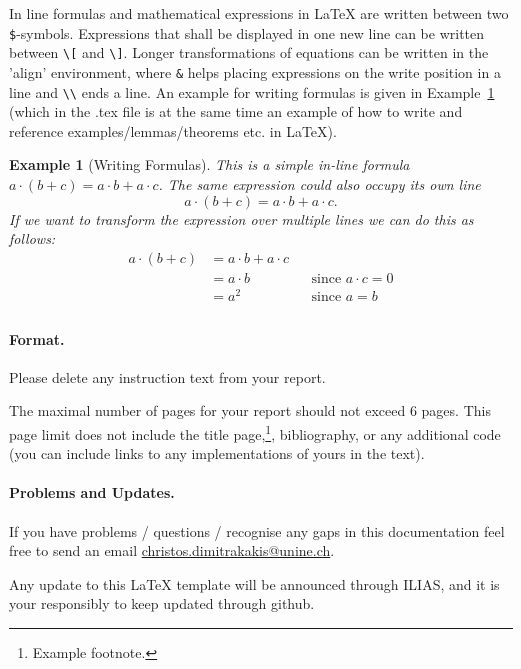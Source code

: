 \documentclass[a4paper,11pt]{article}
\newtheorem{example}{Example}
\theoremstyle{definition}
\begin{document}
In line formulas and mathematical expressions in \LaTeX{} are written between two \verb|$|-symbols. Expressions that shall be displayed in one new line can be written between 
\verb|\[| and \verb|\]|. Longer transformations of equations can be written in the 'align' environment, where \verb|&| helps placing expressions on the write position in a line and \verb|\\| ends a line. An  example for writing formulas is given in Example~\ref{ex:formulas} (which in the .tex file is at the same time an example of how to write and reference examples/lemmas/theorems etc. in \LaTeX{}).
\begin{example}[Writing Formulas]\label{ex:formulas}
This is a simple in-line formula $a \cdot (b + c) = a \cdot b + a \cdot c$. The same expression could also occupy its own line \[a \cdot (b + c) = a \cdot b + a \cdot c.\]
If we want to transform the expression over multiple lines we can do this as follows:
\begin{align*}
	a \cdot (b + c) &= a \cdot b + a \cdot c  && \\
					&= a \cdot b  &&  \text{since } a \cdot c = 0\\
					&= a^2  && \text{since } a=b\\
\end{align*}
\end{example}


\paragraph{Format.} Please delete any instruction text from your report. 

The maximal number of pages for your report should not exceed 6 pages. This page limit does not include the title page,\footnote{Example footnote.}, bibliography, or any additional code (you can include links to any implementations of yours in the text).  

\paragraph{Problems and Updates.}
If you have problems / questions / recognise any gaps in this documentation feel free to send an email  \href{mailto:christos.dimitrakakis@unine.ch}{christos.dimitrakakis@unine.ch}.

Any update to this \LaTeX{} template will be announced through ILIAS, and it is your responsibly to keep updated through github.


\end{document}
